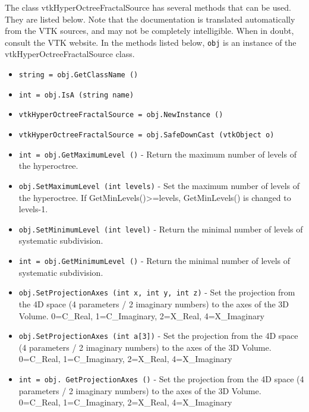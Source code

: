 The class vtkHyperOctreeFractalSource has several methods that can be used.
  They are listed below.
Note that the documentation is translated automatically from the VTK sources,
and may not be completely intelligible.  When in doubt, consult the VTK website.
In the methods listed below, \verb|obj| is an instance of the vtkHyperOctreeFractalSource class.
\begin{itemize}
\item  \verb|string = obj.GetClassName ()|

\item  \verb|int = obj.IsA (string name)|

\item  \verb|vtkHyperOctreeFractalSource = obj.NewInstance ()|

\item  \verb|vtkHyperOctreeFractalSource = obj.SafeDownCast (vtkObject o)|

\item  \verb|int = obj.GetMaximumLevel ()| -  Return the maximum number of levels of the hyperoctree.
 

\item  \verb|obj.SetMaximumLevel (int levels)| -  Set the maximum number of levels of the hyperoctree. If
 GetMinLevels()>=levels, GetMinLevels() is changed to levels-1.
 
 
 

\item  \verb|obj.SetMinimumLevel (int level)| -  Return the minimal number of levels of systematic subdivision.
 

\item  \verb|int = obj.GetMinimumLevel ()| -  Return the minimal number of levels of systematic subdivision.
 

\item  \verb|obj.SetProjectionAxes (int x, int y, int z)| -  Set the projection from  the 4D space (4 parameters / 2 imaginary numbers)
 to the axes of the 3D Volume. 
 0=C\_Real, 1=C\_Imaginary, 2=X\_Real, 4=X\_Imaginary

\item  \verb|obj.SetProjectionAxes (int a[3])| -  Set the projection from  the 4D space (4 parameters / 2 imaginary numbers)
 to the axes of the 3D Volume. 
 0=C\_Real, 1=C\_Imaginary, 2=X\_Real, 4=X\_Imaginary

\item  \verb|int = obj. GetProjectionAxes ()| -  Set the projection from  the 4D space (4 parameters / 2 imaginary numbers)
 to the axes of the 3D Volume. 
 0=C\_Real, 1=C\_Imaginary, 2=X\_Real, 4=X\_Imaginary


\end{itemize}
